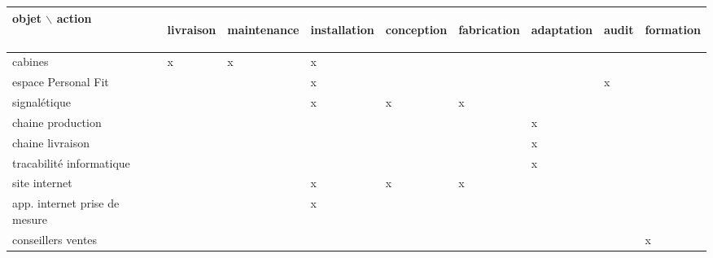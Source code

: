 

\begin{tabular}{|l||l|l|l|l|l|l|l|l|}
\hline
objet $\backslash$ action 	&\begin{sideways}livraison\end{sideways}   
					&\begin{sideways}maintenance\end{sideways}
					&\begin{sideways}installation \end{sideways}
					&\begin{sideways}conception \end{sideways}
					&\begin{sideways}fabrication\end{sideways}
					&\begin{sideways}adaptation\end{sideways}
					&\begin{sideways}audit\end{sideways}
					&\begin{sideways}formation\end{sideways}\\
\hline
cabines			&	x	   & x	   &	x		&	 	&		&		& 	&\\	
espace Personal Fit	&		   &  	   &  x		&		& 		& 		& x 	&\\
signalétique		&		   & 		   &  x		& x		& x		&		&	&\\			
chaine production		& 		   &		   &  		&		&		& x		& 	&\\	
chaine livraison		& 		   &		   &  		&		&		& x		& 	&\\	
tracabilité informatique& 		   &		   &  		&		&		& x		& 	&\\	
site internet		&		   & 		   &  x		& x		& x		&		&	&\\			
app. internet prise de mesure &	   &		   &  x		&		&		& 		&     &\\	
conseillers ventes	&		   &		   &			&		&		&		&	& x \\		
\hline
\end{tabular}
